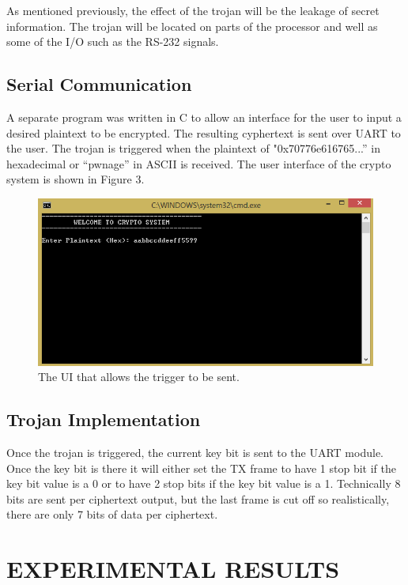 \documentclass[letterpaper, 10 pt, conference]{ieeeconf}  %
\begin{document}
As mentioned previously, the effect of the trojan will be the leakage of secret information.  The trojan will be located on parts of the processor and well as some of the I/O such as the RS-232 signals.

\subsection{Serial Communication}

A separate program was written in C to allow an interface for the user to input a desired plaintext to be encrypted.  The resulting cyphertext is sent over UART to the user.  The trojan is triggered when the plaintext of "0x70776e616765...” in hexadecimal or “pwnage” in ASCII is received.  The user interface of the crypto system is shown in Figure 3.

\begin{figure}[thpb]
	\centering
	\includegraphics[scale=.50]{SerialProg}
   \caption{The UI that allows the trigger to be sent.}
\end{figure}

\subsection{Trojan Implementation}

Once the trojan is triggered, the current key bit is sent to the UART module. Once the key bit is there it will either set the TX frame to have 1 stop bit if the key bit value is a 0 or to have 2 stop bits if the key bit value is a 1. Technically 8 bits are sent per ciphertext output, but the last frame is cut off so realistically, there are only 7 bits of data per ciphertext.

  
\section{EXPERIMENTAL RESULTS}
\end{document}
